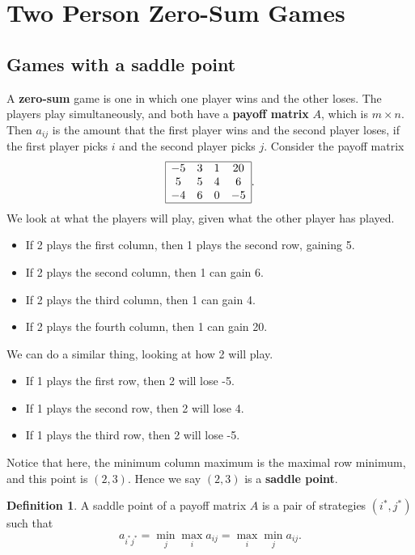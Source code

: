 \documentclass[12pt]{article}
\theoremstyle{definition}
\newtheorem{definition}{Definition}[section]
\theoremstyle{remark}
\begin{document}
\newpage

\section{Two Person Zero-Sum Games}%
\label{sec:two_person_zero_sum_games}

\subsection{Games with a saddle point}%
\label{sub:games_with_a_saddle_point}

A \textbf{zero-sum} game is one in which one player wins and the other loses. The players play simultaneously, and both have a \textbf{payoff matrix} $A$, which is $m \times n$. Then $a_{ij}$ is the amount that the first player wins and the second player loses, if the first player picks $i$ and the second player picks $j$. Consider the payoff matrix
\[
	\begin{array}{|cccc|}
		\hline
		-5 & 3 & 1 & 20 \\
		5 & 5 & 4 & 6 \\
		-4 & 6 & 0 & -5 \\
		\hline
\end{array}
.\]
We look at what the players will play, given what the other player has played.
\begin{itemize}
	\item If 2 plays the first column, then 1 plays the second row, gaining 5.
	\item If 2 plays the second column, then 1 can gain 6.
	\item If 2 plays the third column, then 1 can gain 4.
	\item If 2 plays the fourth column, then 1 can gain 20.
\end{itemize}
We can do a similar thing, looking at how 2 will play.
\begin{itemize}
	\item If 1 plays the first row, then 2 will lose -5.
	\item If 1 plays the second row, then 2 will lose 4.
	\item If 1 plays the third row, then 2 will lose -5.
\end{itemize}
Notice that here, the minimum column maximum is the maximal row minimum, and this point is $(2, 3)$. Hence we say $(2, 3)$ is a \textbf{saddle point}.

\begin{definition}
	A saddle point of a payoff matrix $A$ is a pair of strategies $(i^{\ast}, j^{\ast})$ such that
	\[
	a_{i^{\ast}j^{\ast}} = \min_{j} \max_{i} a_{ij} = \max_{i} \min_{j} a_{ij}
	.\]
\end{definition}
\end{document}
